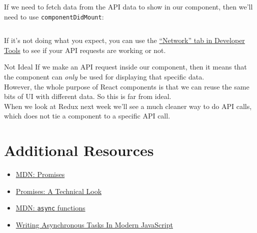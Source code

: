 If we need to fetch data from the API data to show in our component, then we'll need to use \texttt{componentDidMount}:

\inputminted{js}{03-async/figures/01-StarWarsFolks.jsx}

If it's not doing what you expect, you can use the \href{https://developer.mozilla.org/en-US/docs/Tools/Network_Monitor}{``Network'' tab in Developer Tools} to see if your API requests are working or not.

\pagebreak

\begin{infobox}{Not Ideal}
    If we make an API request inside our component, then it means that the component can \textit{only} be used for displaying that specific data.
    \\

    However, the whole purpose of React components is that we can reuse the same bits of UI with different data. So this is far from ideal.
    \\

    When we look at Redux next week we'll see a much cleaner way to do API calls, which does not tie a component to a specific API call.
\end{infobox}

\section{Additional Resources}

\begin{itemize}[leftmargin=*]
    \item \href{https://developer.mozilla.org/en-US/docs/Web/JavaScript/Reference/Global_Objects/Promise}{MDN: Promises}
    \item \href{http://exploringjs.com/es6/ch_promises.html}{Promises: A Technical Look}
    \item \href{https://developer.mozilla.org/en-US/docs/Web/JavaScript/Reference/Statements/async_function}{MDN: \texttt{async} functions}
    \item \href{https://www.smashingmagazine.com/2019/10/asynchronous-tasks-modern-javascript/}{Writing Asynchronous Tasks In Modern JavaScript}
\end{itemize}
